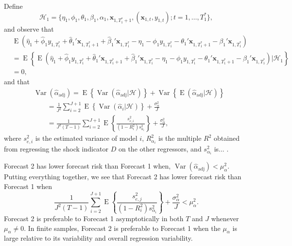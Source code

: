 \documentclass[11pt]{article}
\newcommand{\x}{\textbf{x}}
\newcommand{\Hist}{\mathcal{H}}
\DeclareMathOperator{\E}{E}
\DeclareMathOperator{\Var}{Var}
\begin{document}
Define
$$
  \Hist_1 = \{\eta_1, \phi_1, \theta_1, \beta_1, \alpha_1, 
    \x_{1,T_1^*+1}, (\x_{1,t}, y_{1,t});  t = 1,\ldots,T_1^*\},
$$
and observe that 
\begin{align*}
  &\E\left(\hat\eta_1 + \hat\phi_1 y_{1,T_1^*} + \hat\theta_1'\x_{1,T_1^*+1} 
    + \hat\beta_1'\x_{1,T_1^*} - \eta_1 - \phi_1 y_{1,T_1^*} 
    - \theta_1'\x_{1,T_1^*+1} - \beta_1'\x_{1,T_1^*}\right) \\
  &= \E\left\{\E\left(\hat\eta_1 + \hat\phi_1 y_{1,T_1^*} 
    + \hat\theta_1'\x_{1,T_1^*+1} + \hat\beta_1'\x_{1,T_1^*} - \eta_1 
    - \phi_1 y_{1,T_1^*} - \theta_1'\x_{1,T_1^*+1} 
    - \beta_1'\x_{1,T_1^*}\right)|\Hist_1\right\} \\
  &= 0,
\end{align*}
and that 
\begin{align*}
  &\Var(\hat{\alpha}_{\text{adj}}) = \E\left\{\Var(\hat{\alpha}_{\text{adj}}|\Hist)\right\} 
    + \Var\left\{\E(\hat{\alpha}_{\text{adj}}|\Hist)\right\} \\
  &\qquad= \frac{1}{J^2} \sum_{i=2}^{J+1} \E\left\{\Var(\hat{\alpha}_i|\Hist)\right\} 
    + \frac{\sigma_{\alpha}^2}{J} \\
  &\qquad= \frac{1}{J^2(T-1)}\sum_{i=2}^{J+1} 
    \E\left\{\frac{s_{e,i}^2}{(1-R^2_i)s_{\alpha_i}^2}\right\} 
      + \frac{\sigma_{\alpha}^2}{J},
\end{align*}
where $s_{e,i}^2$ is the estimated variance of model $i$, $R^2_{\alpha_i}$ is 
the multiple $R^2$ obtained from regressing the shock indicator $D$ on the 
other regressors, and $s_{\alpha_i}^2$ is... .

Forecast 2 has lower forecast risk than Forecast 1 when,  
$
  \Var(\hat{\alpha}_{\text{adj}}) 
    < \mu_{\alpha}^2.
$
Putting everything together, we see that Forecast 2 has lower forecast risk 
than Forecast 1 when 
$$
  \frac{1}{J^2(T-1)}\sum_{i=2}^{J+1} \E\left\{\frac{s_{e,j}^2}{(1-R^2_i)s_{\alpha_i}^2}\right\} 
    + \frac{\sigma_{\alpha}^2}{J} < \mu_{\alpha}^2.
$$
Forecast 2 is preferable to Forecast 1 asymptotically in both $T$ and $J$ 
whenever $\mu_{\alpha} \neq 0$. In finite samples, Forecast 2 is preferable to 
Forecast 1 when the $\mu_{\alpha}$ is large relative to its variability and 
overall regression variability.  











\end{document}
